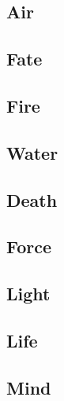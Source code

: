 \begin{multicols}{2}

\subsection{Air}


\subsection{Fate}


\subsection{Fire}


\subsection{Water}


\subsection{Death}


\subsection{Force}


\subsection{Light}


\subsection{Life}



\subsection{Mind}


\end{multicols}

